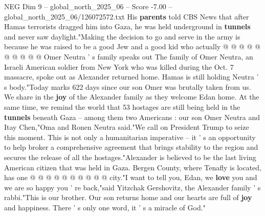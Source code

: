 \begin{textsample}{NEG Dim 9 – global\_north\_2025\_06 – Score -7.00 – global\_north\_2025\_06/126072572.txt}
His \textbf{parents} told CBS News that after Hamas terrorists dragged him into Gaza, he was held underground in \textbf{tunnels} and never saw daylight."Making the decision to go and serve in the army is because he was raised to be a good Jew and a good kid who actually @ @ @ @ @ @ @ @ @ @ Omer Neutra ' s family speaks out The family of Omer Neutra, an Israeli American soldier from New York who was killed during the Oct. 7 massacre, spoke out as Alexander returned home.
Hamas is still holding Neutra ' s body."Today marks 622 days since our son Omer was brutally taken from us.
We share in the \textbf{joy} of the Alexander family as they welcome Edan home.
At the same time, we remind the world that 53 hostages are still being held in the \textbf{tunnels} beneath Gaza -- among them two Americans : our son Omer Neutra and Itay Chen,"Oma and Ronen Neutra said."We call on President Trump to seize this moment.
This is not only a humanitarian imperative -- it ' s an opportunity to help broker a comprehensive agreement that brings stability to the region and secures the release of all the hostages."Alexander is believed to be the last living American citizen that was held in Gaza.
Bergen County, where Tenafly is located, has one @ @ @ @ @ @ @ @ @ @ city."I want to tell you, Edan, we \textbf{love} you and we are so happy you ' re back,"said Yitzchak Gershovitz, the Alexander family ' s rabbi."This is our brother.
Our son returns home and our hearts are full of \textbf{joy} and happiness.
There ' s only one word, it ' s a miracle of God."

\end{textsample}
